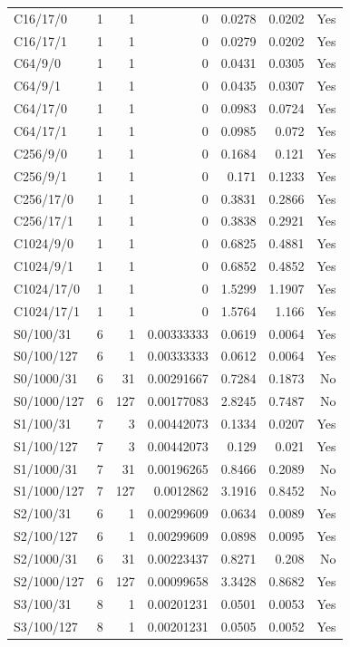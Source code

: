 \begin{longtable}{lrrrrrr}
C16/17/0 & 1 & 1 & 0 & 0.0278 & 0.0202 & Yes \\
C16/17/1 & 1 & 1 & 0 & 0.0279 & 0.0202 & Yes \\
C64/9/0 & 1 & 1 & 0 & 0.0431 & 0.0305 & Yes \\
C64/9/1 & 1 & 1 & 0 & 0.0435 & 0.0307 & Yes \\
C64/17/0 & 1 & 1 & 0 & 0.0983 & 0.0724 & Yes \\
C64/17/1 & 1 & 1 & 0 & 0.0985 & 0.072 & Yes \\
C256/9/0 & 1 & 1 & 0 & 0.1684 & 0.121 & Yes \\
C256/9/1 & 1 & 1 & 0 & 0.171 & 0.1233 & Yes \\
C256/17/0 & 1 & 1 & 0 & 0.3831 & 0.2866 & Yes \\
C256/17/1 & 1 & 1 & 0 & 0.3838 & 0.2921 & Yes \\
C1024/9/0 & 1 & 1 & 0 & 0.6825 & 0.4881 & Yes \\
C1024/9/1 & 1 & 1 & 0 & 0.6852 & 0.4852 & Yes \\
C1024/17/0 & 1 & 1 & 0 & 1.5299 & 1.1907 & Yes \\
C1024/17/1 & 1 & 1 & 0 & 1.5764 & 1.166 & Yes \\
S0/100/31 & 6 & 1 & 0.00333333 & 0.0619 & 0.0064 & Yes \\
S0/100/127 & 6 & 1 & 0.00333333 & 0.0612 & 0.0064 & Yes \\
S0/1000/31 & 6 & 31 & 0.00291667 & 0.7284 & 0.1873 & No \\
S0/1000/127 & 6 & 127 & 0.00177083 & 2.8245 & 0.7487 & No \\
S1/100/31 & 7 & 3 & 0.00442073 & 0.1334 & 0.0207 & Yes \\
S1/100/127 & 7 & 3 & 0.00442073 & 0.129 & 0.021 & Yes \\
S1/1000/31 & 7 & 31 & 0.00196265 & 0.8466 & 0.2089 & No \\
S1/1000/127 & 7 & 127 & 0.0012862 & 3.1916 & 0.8452 & No \\
S2/100/31 & 6 & 1 & 0.00299609 & 0.0634 & 0.0089 & Yes \\
S2/100/127 & 6 & 1 & 0.00299609 & 0.0898 & 0.0095 & Yes \\
S2/1000/31 & 6 & 31 & 0.00223437 & 0.8271 & 0.208 & No \\
S2/1000/127 & 6 & 127 & 0.00099658 & 3.3428 & 0.8682 & Yes \\
S3/100/31 & 8 & 1 & 0.00201231 & 0.0501 & 0.0053 & Yes \\
S3/100/127 & 8 & 1 & 0.00201231 & 0.0505 & 0.0052 & Yes \\

\end{longtable}

